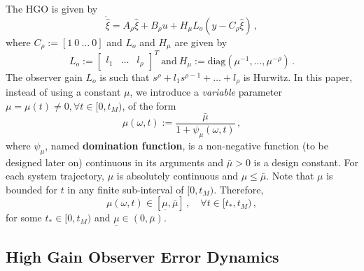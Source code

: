 \documentclass{rncauth}
\begin{document}
The HGO is given by
%
\begin{equation}
\dot{\hat{\xi}}=A_\rho \hat{\xi} +  B_\rho u +H_\mu L_o (y-C_\rho
\hat{\xi})\,,\label{eq:reducedHGO}
\end{equation}
%
where $C_\rho:=[1 \ 0 \ \ldots \ 0]$ and $L_o$ and $H_\mu$ are
given by
%
\begin{equation}
L_o\!:=\![\begin{array}{ccc} l_{1} & \ldots &
l_{\rho}\end{array}]^T \ \mbox{and} \
H_\mu\!:=\!\mbox{diag}(\mu^{-1},\ldots,\mu^{-\rho})\,.
\label{eq:defLhgo_and_Hhgo}
\end{equation}
%
The observer gain $L_o$ is such that $s^{\rho}\!+\!l_1
s^{\rho-1}\!+\!\ldots\!+\!l_{\rho}$ is Hurwitz. In this paper,
instead of using a constant $\mu$, we introduce a {\em variable}
parameter $\mu=\mu(t)\neq\!0, \forall t\in[0,t_M)$, %
of the form
%
\begin{equation}
\mu(\omega,t):=\frac{\bar{\mu}}{1+
\psi_\mu(\omega,t)}\,,\label{eq:def_mu}
\end{equation}
%
where $\psi_\mu$, named \textbf{domination function}, is a
non-negative function (to be designed later on) continuous in its
arguments and $\bar{\mu}\!>\!0$ is a design constant. For each
system trajectory, $\mu$ is absolutely continuous and
$\mu\!\leq\!\bar{\mu}$. Note that $\mu$ is bounded for $t$ in any
finite sub-interval of $[0,t_M)$. Therefore,
%
\begin{equation}
\mu(\omega,t)\in[\underline{\mu},\bar{\mu}]\,, \quad \forall
t\!\in\![t_*,t_M)\,, \label{eq:P3}
\end{equation}
%
for some $t_* \in [0,t_M)$ and
$\underline{\mu}\!\in\!(0,\bar{\mu})$. 



\subsection{High Gain Observer Error Dynamics}
\end{document}
